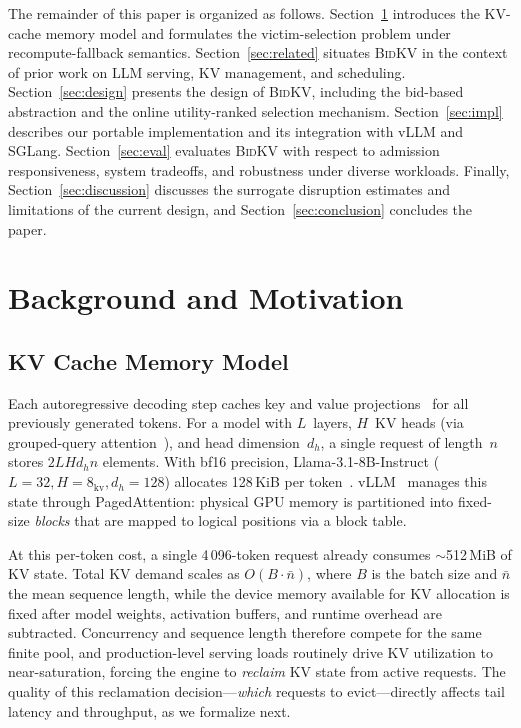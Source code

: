 \documentclass[conference]{IEEEtran}
\newcommand{\bidkv}{\textsc{BidKV}\xspace}
\begin{document}
The remainder of this paper is organized as follows.
Section~\ref{sec:background} introduces the KV-cache memory model and formulates the victim-selection problem under recompute-fallback semantics.
Section~\ref{sec:related} situates \bidkv in the context of prior work on LLM serving, KV management, and scheduling.
Section~\ref{sec:design} presents the design of \bidkv, including the bid-based abstraction and the online utility-ranked selection mechanism.
Section~\ref{sec:impl} describes our portable implementation and its integration with vLLM and SGLang.
Section~\ref{sec:eval} evaluates \bidkv with respect to admission responsiveness, system tradeoffs, and robustness under diverse workloads.
Finally, Section~\ref{sec:discussion} discusses the surrogate disruption estimates and limitations of the current design, and Section~\ref{sec:conclusion} concludes the paper.

\section{Background and Motivation}\label{sec:background}

\subsection{KV Cache Memory Model}\label{sec:bg:kvcache}

Each autoregressive decoding step caches key and value
projections~\cite{Vaswani2017} for all previously generated tokens.  For a
model with $L$~layers, $H$~KV heads (via grouped-query
attention~\cite{Ainslie2023}), and head dimension~$d_h$, a single request of
length~$n$ stores $2LHd_h n$ elements.  With bf16 precision, Llama-3.1-8B-Instruct ($L{=}32,
H{=}8_{\text{kv}}, d_h{=}128$) allocates 128\,KiB per
token~\cite{Grattafiori2024}.  vLLM~\cite{Kwon2023} manages this state through
PagedAttention: physical GPU memory is partitioned into fixed-size \emph{blocks}
that are mapped to logical positions via a block table.

At this per-token cost, a single 4\,096-token request already consumes
$\sim$512\,MiB of KV state.  Total KV demand scales as $O(B \cdot \bar{n})$,
where $B$ is the batch size and $\bar{n}$ the mean sequence length, while the
device memory available for KV allocation is fixed after model weights, activation
buffers, and runtime overhead are subtracted.  Concurrency and sequence length
therefore compete for the same finite pool, and production-level serving loads
routinely drive KV utilization to near-saturation, forcing the engine to
\emph{reclaim} KV state from active requests.  The quality of this reclamation
decision---\emph{which} requests to evict---directly affects tail latency and
throughput, as we formalize next.
\end{document}
